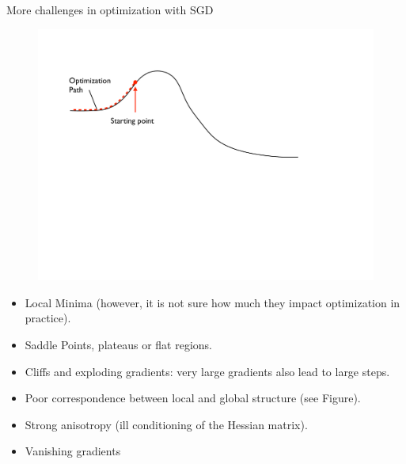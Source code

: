 \documentclass[handout,xcolor=pdftex,dvipsnames,table,mathserif]{beamer}
\begin{document}
\begin{frame}{More challenges in optimization with SGD}
\begin{figure}[htb]
	\centering
	\includegraphics[width=.75\columnwidth]{../graphics/Global_local.pdf}
\end{figure}
\begin{itemize}
\item Local Minima (however, it is not sure how much they impact optimization in practice). 
\item Saddle Points, plateaus or flat regions.
\item Cliffs and exploding gradients: very large gradients also lead to large steps.
\item Poor correspondence between local and global structure (see Figure).
\item Strong anisotropy (ill conditioning of the Hessian matrix).
\item Vanishing gradients
\end{itemize}
\end{frame}
\end{document}
